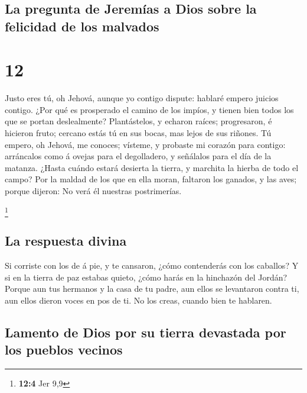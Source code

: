 \hypertarget{la-pregunta-de-jeremuxedas-a-dios-sobre-la-felicidad-de-los-malvados}{%
\subsection{La pregunta de Jeremías a Dios sobre la felicidad de los
malvados}\label{la-pregunta-de-jeremuxedas-a-dios-sobre-la-felicidad-de-los-malvados}}

\hypertarget{section-11}{%
\section{12}\label{section-11}}

 Justo eres tú, oh Jehová, aunque yo contigo dispute:
hablaré empero juicios contigo. ¿Por qué es prosperado el camino de los
impíos, y tienen bien todos los que se portan deslealmente?
 Plantástelos, y echaron raíces; progresaron, é hicieron
fruto; cercano estás tú en sus bocas, mas lejos de sus riñones.
 Tú empero, oh Jehová, me conoces; vísteme, y probaste mi
corazón para contigo: arráncalos como á ovejas para el degolladero, y
señálalos para el día de la matanza.  ¿Hasta cuándo estará
desierta la tierra, y marchita la hierba de todo el campo? Por la maldad
de los que en ella moran, faltaron los ganados, y las aves; porque
dijeron: No verá él nuestras postrimerías.

\footnote{\textbf{12:4} Jer 9,9}

\hypertarget{la-respuesta-divina}{%
\subsection{La respuesta divina}\label{la-respuesta-divina}}

 Si corriste con los de á pie, y te cansaron, ¿cómo
contenderás con los caballos? Y si en la tierra de paz estabas quieto,
¿cómo harás en la hinchazón del Jordán?  Porque aun tus
hermanos y la casa de tu padre, aun ellos se levantaron contra ti, aun
ellos dieron voces en pos de ti. No los creas, cuando bien te hablaren.

\hypertarget{lamento-de-dios-por-su-tierra-devastada-por-los-pueblos-vecinos}{%
\subsection{Lamento de Dios por su tierra devastada por los pueblos
vecinos}\label{lamento-de-dios-por-su-tierra-devastada-por-los-pueblos-vecinos}}

